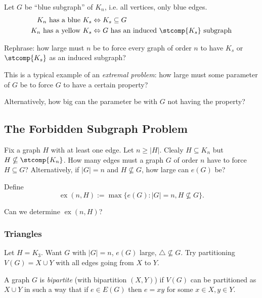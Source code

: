 \documentclass[a4paper]{article}
\DeclareMathOperator{\exx}{ex}
\begin{document}
Let \(G\) be ``blue subgraph'' of \(K_n\), i.e. all vertices, only blue edges.
\begin{align*}
  K_n \text{ has a blue } K_s &\Leftrightarrow K_s \subseteq G \\
  K_n \text{ has a yellow } K_s &\Leftrightarrow G \text{ has an induced } \stcomp{K_s} \text{ subgraph}
\end{align*}

Rephrase: how large must \(n\) be to force every graph of order \(n\) to have \(K_s\) or \(\stcomp{K_s}\) as an induced subgraph?

This is a typical example of an \emph{extremal problem}: how large must some parameter of \(G\) be to force \(G\) to have a certain property?

Alternatively, how big can the parameter be with \(G\) not having the property?

\subsection{The Forbidden Subgraph Problem}

Fix a graph \(H\) with at least one edge. Let \(n \geq |H|\). Clealy \(H \subseteq K_n\) but \(H \nsubseteq \stcomp{K_n}\). How many edges must a graph \(G\) of order \(n\) have to force \(H \subseteq G\)? Alternatively, if \(|G| = n\) and \(H \nsubseteq G\), how large can \(e(G)\) be?

\begin{definition}
  Define
  \[
    \exx(n,H) := \max\{ e(G): |G|=n, H \nsubseteq G\}.
  \]
\end{definition}

\begin{question}
  Can we determine \(\exx(n,H)\)?
\end{question}

\subsubsection{Triangles}

Let \(H = K_3\). Want \(G\) with \(|G| = n\), \(e(G)\) large, \(\triangle \nsubseteq G\). Try partitioning \(V(G) = X\cup Y\) with all edges going from \(X\) to \(Y\).

\begin{definition}
  A graph \(G\) is \emph{bipartite} (with bipartition \((X,Y)\)) if \(V(G)\) can be partitioned as \(X\cup Y\) in such a way that if \(e\in E(G)\) then \(e=xy\) for some \(x\in X, y\in Y\).
\end{definition}
\end{document}
